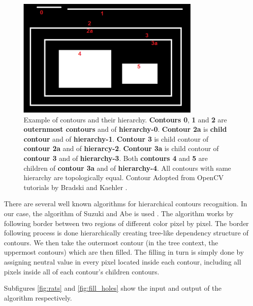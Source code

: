 \documentclass[pdftex,12pt,a4paper]{report}
\begin{document}
\begin{figure}[H]
\centering
\includegraphics[width=0.8\textwidth]{images/contours}
\caption{Example of contours and their hierarchy. \textbf{Contours 0}, \textbf{1} and \textbf{2} are \textbf{outernmost contours} and of \textbf{hierarchy-0}. \textbf{Contour 2a} is \textbf{child contour} and of \textbf{hierarchy-1}. \textbf{Contour 3} is child contour of \textbf{contour 2a} and of \textbf{hierarcy-2}. \textbf{Contour 3a} is child contour of  \textbf{contour 3} and of \textbf{hierarchy-3}. Both \textbf{contours 4} and \textbf{5} are children of \textbf{contour 3a} and of \textbf{hierarchy-4}. All contours with same hierarchy are topologically equal. Contour Adopted from OpenCV tutorials by Bradski and Kaehler \cite{bradski2008learning}.}
\label{fig:contours}
\end{figure}

There are several well known algorithms for hierarchical contours recognition. In our case, the algorithm of Suzuki and Abe is used \cite{suzuki1985topological}. The algorithm works by following border between two regions of different color pixel by pixel. The border following process is done hierarchically creating tree-like dependency structure of contours. We then take the outermost contour (in the tree context, the uppermost contours) which are then filled. The filling in turn is simply done by assigning neutral value in every pixel located inside each contour, including all pixels inside all of each contour's children contours.

Subfigures \ref{fig:rats} and \ref{fig:fill_holes} show the input and output of the algorithm respectively.
\end{document}
